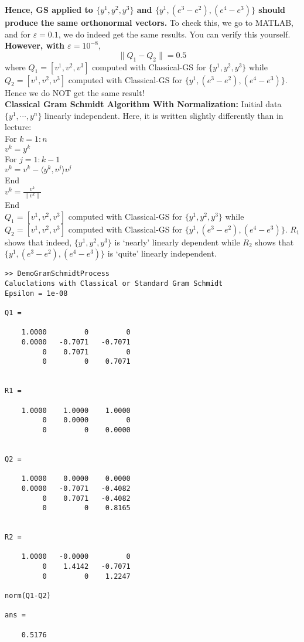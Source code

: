 \documentclass[letterpaper]{article}
\begin{document}
    \textbf{Hence, GS applied to $\{y^1,y^2,y^3\}$ and $\{y^1,(e^3-e^2),(e^4-e^3)\}$ should produce the same orthonormal vectors.} To check this, we go to MATLAB, and for $\varepsilon=0.1$, we do indeed get the same results. You can verify this yourself. \textbf{However, with $\varepsilon=10^{-8}$},
    \begin{equation*}
        \|Q_1-Q_2\|=0.5
    \end{equation*}
    where $Q_1=[v^1, v^2, v^3]$ computed with Classical-GS for $\{y^1,y^2,y^3\}$ while $Q_2=[v^1, v^2, v^3]$ computed with Classical-GS for $\{y^1,(e^3-e^2),(e^4-e^3)\}$. Hence we do NOT get the same result!
\\
\noindent \textbf{Classical Gram Schmidt Algorithm With Normalization:} Initial data $\{y^1,\dotsb,y^n\}$ linearly independent. Here, it is written slightly differently than in lecture:\\


        For $k=1:n$\\
        \indent\hspace{4ex}$v^k=y^k$\\
        \indent\hspace{4ex}For $j=1:k-1$\\
        \indent\hspace{8ex}$v^k=v^k-\langle y^k,v^j\rangle v^j$\\
        \indent\hspace{4ex}End\\
        \indent\hspace{4ex}$v^k =\frac{v^k}{\|v^k\|}$\\
        End\\

\newpage
$Q_1=[v^1, v^2, v^3]$ computed with Classical-GS for $\{y^1,y^2,y^3\}$ while $Q_2=[v^1, v^2, v^3]$ computed with Classical-GS for $\{y^1,(e^3-e^2),(e^4-e^3)\}$. $R_1$ shows that indeed, $\{y^1,y^2,y^3\}$ is `nearly' linearly dependent while $R_2$ shows that $\{y^1,(e^3-e^2),(e^4-e^3)\}$ is `quite' linearly independent.

\begin{verbatim}
>> DemoGramSchmidtProcess
Caluclations with Classical or Standard Gram Schmidt
Epsilon = 1e-08

Q1 =

    1.0000         0         0
    0.0000   -0.7071   -0.7071
         0    0.7071         0
         0         0    0.7071


R1 =

    1.0000    1.0000    1.0000
         0    0.0000         0
         0         0    0.0000


Q2 =

    1.0000    0.0000    0.0000
    0.0000   -0.7071   -0.4082
         0    0.7071   -0.4082
         0         0    0.8165


R2 =

    1.0000   -0.0000         0
         0    1.4142   -0.7071
         0         0    1.2247

norm(Q1-Q2)

ans =

    0.5176

    \end{verbatim}
\end{document}
